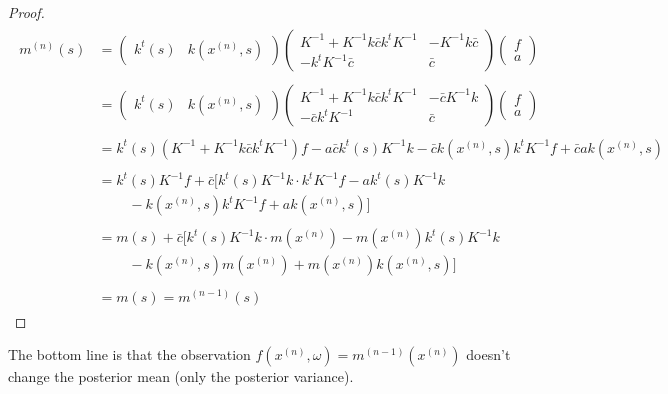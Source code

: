 \documentclass[paper=a4, fontsize=11pt]{scrartcl} %
\numberwithin{equation}{section} %
\numberwithin{figure}{section} %
\numberwithin{table}{section} %
\newcommand{\bars}{ \ \ \ \ \ \ \ \ \ \ }
\newcommand{\xn}{x^{(n)}} %
\newcommand{\mn}{m^{(n)}}
\newcommand{\mnm}{m^{(n-1)}}
\newcommand{\Kinv}{K^{-1}} %
\begin{document}
\begin{proof}
\begin{align}
 \begin{split}
%
\mn(s) &= \left( \begin{array}{cc}
 k^t(s)  & k(\xn, s)  
\end{array} \right)
%
%
\left( \begin{array}{cc}
\Kinv + \Kinv k \bar{c} k^t \Kinv  &  -\Kinv k \bar{c} \\
-k^t\Kinv \bar{c}   &  \bar{c}
 \end{array} \right)
%
%
\left( \begin{array}{cc}
 f  \\ a 
 \end{array} \right) \\\\
%
%
%
%
%
%
%
%
&= \left( \begin{array}{cc}
 k^t(s)  & k(\xn, s)
 \end{array} \right)
%
%
\left( \begin{array}{cc}
\Kinv + \Kinv k \bar{c} k^t \Kinv  &  -\bar{c}\Kinv k  \\
-\bar{c}k^t\Kinv   & \bar{c}
 \end{array} \right)
%
%
\left( \begin{array}{cc}
 f  \\ a
  \end{array} \right) \\\\
%
%
&=  k^t(s)(\Kinv + \Kinv k \bar{c}k^t \Kinv )f - a\bar{c} k^t(s) \Kinv k  -\bar{c} k(\xn,s) k^t\Kinv f + \bar{c}a k(\xn,s) \\\\
%
%
&=  k^t(s)\Kinv f + \bar{c}[k^t(s)\Kinv k\cdot  k^t \Kinv f - a k^t(s) \Kinv k \\
 &\bars - k(\xn, s) k^t\Kinv f + a k(\xn,s)] \\\\
%
%
%
&= m(s) + \bar{c}[k^t(s)\Kinv k\cdot  m (\xn) -m(\xn) k^t(s) \Kinv k \\
 &\bars - k(\xn, s) m(\xn) + m(\xn) k(\xn,s)] \\\\
%
%
%
& = m(s) = \mnm (s)
\end{split}
\end{align}
\end{proof}

The bottom line is that the observation $f( \xn ,\omega) = \mnm(\xn)$ doesn't change the posterior mean (only the posterior variance).
\end{document}

